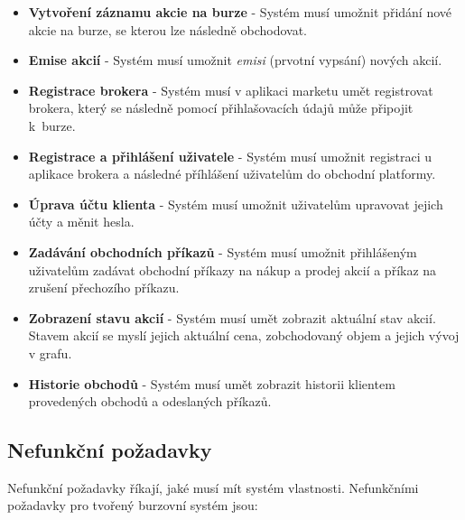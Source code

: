 \documentclass[thesis=M,czech]{FITthesis}[2012/06/26]
\begin{document}
\begin{itemize}

  \item \textbf{Vytvoření záznamu akcie na burze} - Systém musí umožnit přidání nové akcie na burze, se kterou lze následně obchodovat.

  \item \textbf{Emise akcií} - Systém musí umožnit \textit{emisi} (prvotní vypsání) nových akcií.

  \item \textbf{Registrace brokera} - Systém musí v aplikaci marketu umět registrovat brokera, který se následně pomocí přihlašovacích údajů může připojit k~burze.

  \item \textbf{Registrace a přihlášení uživatele} - Systém musí umožnit registraci u aplikace brokera a následné příhlášení uživatelům do obchodní platformy.
  
  \item \textbf{Úprava účtu klienta} - Systém musí umožnit uživatelům upravovat jejich účty a měnit hesla.
  
  \item \textbf{Zadávání obchodních příkazů} - Systém musí umožnit přihlášeným uživatelům zadávat obchodní příkazy na nákup a prodej akcií a příkaz na zrušení přechozího příkazu.
  
  \item \textbf{Zobrazení stavu akcií} - Systém musí umět zobrazit aktuální stav akcií. Stavem akcií se myslí jejich aktuální cena, zobchodovaný objem a jejich vývoj v grafu.
  
  \item \textbf{Historie obchodů} - Systém musí umět zobrazit historii klientem provedených obchodů a odeslaných příkazů.

\end{itemize}


\subsection{Nefunkční požadavky}
\label{sec:requirements2}

	Nefunkční požadavky říkají, jaké musí mít systém vlastnosti. Nefunkčními požadavky pro tvořený burzovní systém jsou:
\end{document}
